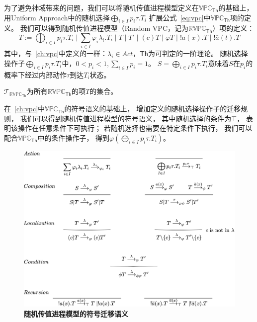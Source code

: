 为了避免神域带来的问题，我们可以将随机传值进程模型定义在$\mathbb{VPC}_{\mathsf{Th}}$的基础上，
用Uniform Approach中的随机选择$\bigoplus_{i\in I}p_i\tau.T_i$
扩展公式~\ref{eq:vpc}中$\mathbb{VPC}_{\mathsf{Th}}$项的定义。
我们可以得到随机传值进程模型（Random VPC，记为$\mathbb{RVPC}_{\mathsf{Th}}$）项的定义：
\begin{equation}\label{eq:rvpc}
   T:=\bigoplus_{i\in I}p_i \tau.T_i\mid \sum_{i\in I} \varphi_i\lambda_i.T_i\mid T \mid T'\mid (c)T\mid \varphi T\mid !a(x).T \mid !\bar{a}(t).T
\end{equation}
其中，与~\ref{ch:vpc}中定义的一样：$\lambda_i \in Act$，$\mathsf{Th}$为可判定的一阶理论。
随机选择操作子$\bigoplus_{i\in I}p_i\tau.T_i$中，$0<p_i<1, \sum_{i\in I}p_i = 1$。
$S=\bigoplus_{i\in I}p_i\tau.T_i$意味着$S$在$p_i$的概率下经过内部动作$\tau$到达$T_i$状态。

$\mathcal{T}_{\mathbb{RVPC}_{\mathsf{Th}}}$为所有$\mathbb{RVPC}_\mathsf{Th}$的项$T$的集合。

在~\ref{ch:vpc}中$\mathbb{VPC}_{\mathsf{Th}}$的符号语义的基础上，
增加\label{fig_rccs}定义的随机选择操作子的迁移规则，
我们可以得到随机传值进程模型的符号语义，
其中随机选择的条件为$\top$，
表明该操作在任意条件下可执行；
若随机选择也需要在特定条件下执行，
我们可以配合$\mathbb{VPC}_{\mathsf{Th}}$中的条件操作子，
得到$\varphi (\bigoplus_{i\in I}p_i\tau.T_i)$。

\begin{figure}[!htbp]
	\small
	\centering
	\includegraphics[width=14cm]{../figures/symbolic_sematic.png}
    \caption{\textbf{随机传值进程模型的符号迁移语义}}
    \label{fig_sematic}
\end{figure}

